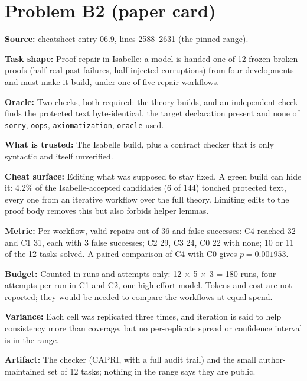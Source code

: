 \documentclass[11pt]{article}
\begin{document}
\section*{Problem B2 (paper card)}\label{ans:B2}
\begin{answer}
\textbf{Source:} cheatsheet entry 06.9, lines 2588--2631 (the pinned range).

\textbf{Task shape:} Proof repair in Isabelle: a model is handed one of 12
frozen broken proofs (half real past failures, half injected corruptions) from
four developments and must make it build, under one of five repair workflows.

\textbf{Oracle:} Two checks, both required: the theory builds, and an
independent check finds the protected text byte-identical, the target
declaration present and none of \texttt{sorry}, \texttt{oops},
\texttt{axiomatization}, \texttt{oracle} used.

\textbf{What is trusted:} The Isabelle build, plus a contract checker that is
only syntactic and itself unverified.

\textbf{Cheat surface:} Editing what was supposed to stay fixed. A green build
can hide it: 4.2\% of the Isabelle-accepted candidates (6 of 144) touched
protected text, every one from an iterative workflow over the full theory.
Limiting edits to the proof body removes this but also forbids helper lemmas.

\textbf{Metric:} Per workflow, valid repairs out of 36 and false successes:
C4 reached 32 and C1 31, each with 3 false successes; C2 29, C3 24, C0 22 with
none; 10 or 11 of the 12 tasks solved. A paired comparison of C4 with C0 gives
$p = 0.001953$.

\textbf{Budget:} Counted in runs and attempts only: 12 $\times$ 5 $\times$ 3
= 180 runs, four attempts per run in C1 and C2, one high-effort model. Tokens
and cost are not reported; they would be needed to compare the workflows at
equal spend.

\textbf{Variance:} Each cell was replicated three times, and iteration is said
to help consistency more than coverage, but no per-replicate spread or
confidence interval is in the range.

\textbf{Artifact:} The checker (CAPRI, with a full audit trail) and the small
author-maintained set of 12 tasks; nothing in the range says they are public.
\end{answer}
\end{document}
